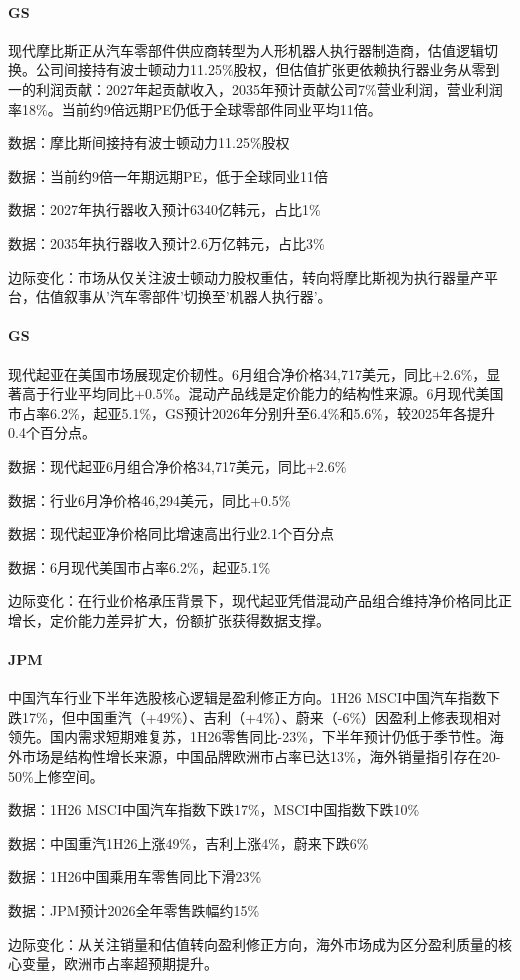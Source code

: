 \documentclass[11pt]{ctexart}
\begin{document}
\paragraph{GS} 现代摩比斯正从汽车零部件供应商转型为人形机器人执行器制造商，估值逻辑切换。公司间接持有波士顿动力11.25\%股权，但估值扩张更依赖执行器业务从零到一的利润贡献：2027年起贡献收入，2035年预计贡献公司7\%营业利润，营业利润率18\%。当前约9倍远期PE仍低于全球零部件同业平均11倍。
{\small\color{refgray}数据：摩比斯间接持有波士顿动力11.25\%股权\par}
{\small\color{refgray}数据：当前约9倍一年期远期PE，低于全球同业11倍\par}
{\small\color{refgray}数据：2027年执行器收入预计6340亿韩元，占比1\%\par}
{\small\color{refgray}数据：2035年执行器收入预计2.6万亿韩元，占比3\%\par}
{\small\color{refgray}边际变化：市场从仅关注波士顿动力股权重估，转向将摩比斯视为执行器量产平台，估值叙事从'汽车零部件'切换至'机器人执行器'。\par}
\paragraph{GS} 现代起亚在美国市场展现定价韧性。6月组合净价格34,717美元，同比+2.6\%，显著高于行业平均同比+0.5\%。混动产品线是定价能力的结构性来源。6月现代美国市占率6.2\%，起亚5.1\%，GS预计2026年分别升至6.4\%和5.6\%，较2025年各提升0.4个百分点。
{\small\color{refgray}数据：现代起亚6月组合净价格34,717美元，同比+2.6\%\par}
{\small\color{refgray}数据：行业6月净价格46,294美元，同比+0.5\%\par}
{\small\color{refgray}数据：现代起亚净价格同比增速高出行业2.1个百分点\par}
{\small\color{refgray}数据：6月现代美国市占率6.2\%，起亚5.1\%\par}
{\small\color{refgray}边际变化：在行业价格承压背景下，现代起亚凭借混动产品组合维持净价格同比正增长，定价能力差异扩大，份额扩张获得数据支撑。\par}
\paragraph{JPM} 中国汽车行业下半年选股核心逻辑是盈利修正方向。1H26 MSCI中国汽车指数下跌17\%，但中国重汽（+49\%）、吉利（+4\%）、蔚来（-6\%）因盈利上修表现相对领先。国内需求短期难复苏，1H26零售同比-23\%，下半年预计仍低于季节性。海外市场是结构性增长来源，中国品牌欧洲市占率已达13\%，海外销量指引存在20-50\%上修空间。
{\small\color{refgray}数据：1H26 MSCI中国汽车指数下跌17\%，MSCI中国指数下跌10\%\par}
{\small\color{refgray}数据：中国重汽1H26上涨49\%，吉利上涨4\%，蔚来下跌6\%\par}
{\small\color{refgray}数据：1H26中国乘用车零售同比下滑23\%\par}
{\small\color{refgray}数据：JPM预计2026全年零售跌幅约15\%\par}
{\small\color{refgray}边际变化：从关注销量和估值转向盈利修正方向，海外市场成为区分盈利质量的核心变量，欧洲市占率超预期提升。\par}
\end{document}
